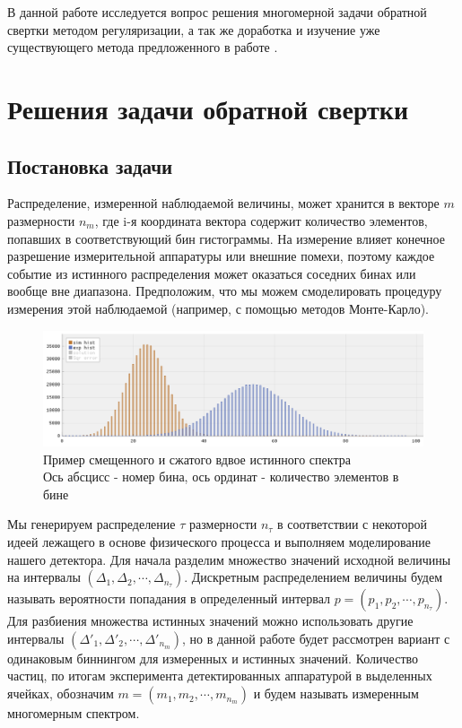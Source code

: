 \documentclass[a4paper,12pt]{diplom}
\begin{document}
В данной работе исследуется вопрос решения многомерной задачи обратной свертки методом регуляризации, а так же доработка и изучение уже
существующего метода предложенного в работе \cite{SvdHocker}.



\chapter{Решения задачи обратной свертки}
\section{Постановка задачи}

Распределение, измеренной наблюдаемой величины, может хранится в векторе $m$ размерности $n_{m}$, где i-я координата вектора содержит 
количество элементов, попавших в соответствующий бин гистограммы. На измерение влияет конечное разрешение измерительной аппаратуры или 
внешние помехи, поэтому каждое событие из истинного распределения может оказаться соседних бинах или вообще вне диапазона. 
Предположим, что мы можем смоделировать процедуру измерения этой наблюдаемой (например, с помощью методов Монте-Карло). 

\begin{figure}[!ht]
   \includegraphics[width=\linewidth]{images/gaus_dist.png}
   \caption{Пример смещенного и сжатого вдвое истинного спектра \\
   Ось абсцисс - номер бина, ось ординат - количество элементов в бине }
   \label{photo:gaus_dist}
 \end{figure}

Мы генерируем распределение $\tau$ размерности $n_{\tau}$ в соответствии с некоторой идеей лежащего в основе физического процесса и 
выполняем моделирование нашего детектора. Для начала разделим множество значений исходной величины на интервалы 
$(\Delta_{1}, \Delta_{2}, \cdots ,\Delta_{n_{\tau}})$. Дискретным распределением величины будем называть вероятности попадания 
в определенный интервал $p = (p_{1}, p_{2}, \cdots, p_{n_{\tau}})$. Для разбиения множества истинных значений можно использовать 
другие интервалы $(\Delta'_{1}, \Delta'_{2}, \cdots ,\Delta'_{n_{m}})$, но в данной работе будет рассмотрен вариант с одинаковым 
биннингом для измеренных и истинных значений. Количество частиц, по итогам эксперимента детектированных аппаратурой в выделенных 
ячейках, обозначим $m = (m_{1}, m_{2}, \cdots, m_{n_{m}})$ и будем называть измеренным многомерным спектром. 
\end{document}
